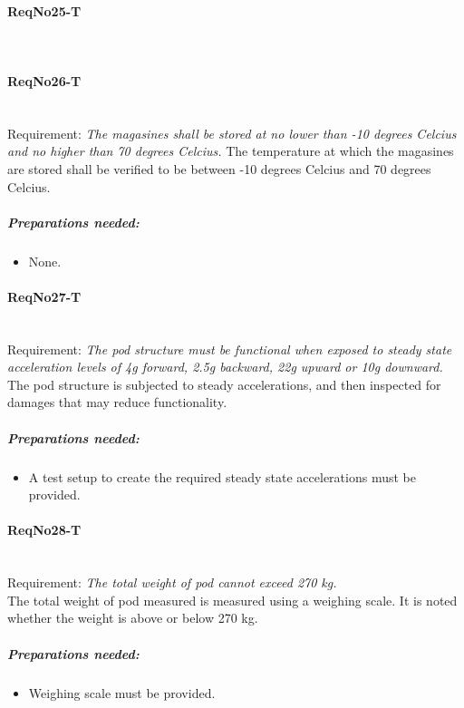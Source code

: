 \paragraph{ReqNo25-T}\mbox{}\\ %

\paragraph{ReqNo26-T}\mbox{}\\ %
Requirement: \textit{The magasines shall be stored at no lower than -10 degrees Celcius and no higher than 70 degrees Celcius.}
The temperature at which the magasines are stored shall be verified to be between -10 degrees Celcius and 70 degrees Celcius.

	\subparagraph{Preparations needed:}
	\begin{itemize}
	\item None.
	\end{itemize}

\paragraph{ReqNo27-T}\mbox{}\\ %
Requirement: \textit{The pod structure must be functional when exposed to steady state acceleration levels of 4g forward, 2.5g backward, 22g upward or 10g downward.}
\\
The pod structure is subjected to steady accelerations, and then inspected for damages that may reduce functionality.

\subparagraph{Preparations needed:}
	\begin{itemize}
	\item A test setup to create the required steady state accelerations must be provided.
	\end{itemize} 
	

\paragraph{ReqNo28-T}\mbox{}\\ %
Requirement: \textit{The total weight of pod cannot exceed 270 kg.}
\\
The total weight of pod measured is measured using a weighing scale. It is noted whether the weight is above or below 270 kg.
\\
	\subparagraph{Preparations needed:}
	\begin{itemize}
	\item Weighing scale must be provided.
	\end{itemize} 

